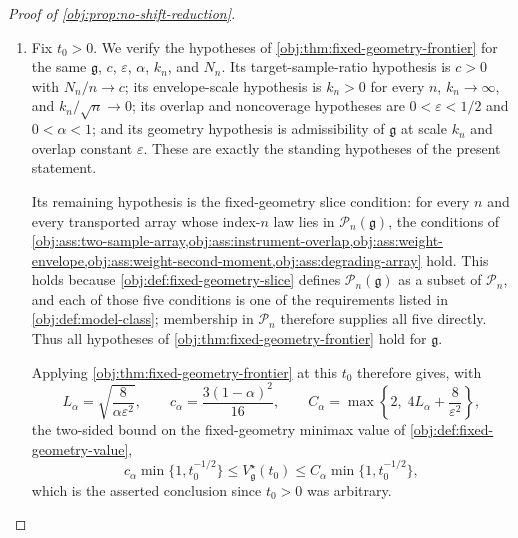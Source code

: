 \begin{proof}[Proof of \cref{obj:prop:no-shift-reduction}]
\begin{enumerate}
By the first step \(\kappa_n=1\), so \(\kappa_n^P=1\), and substituting this into the display for \(t_n\) yields
\[
t_n
=
\frac{n\mu_n^2}{\kappa_n^P}
=
\frac{n\mu_n^2}{\kappa_n}
=
\frac{n\mu_n^2}{1}
=
n\mu_n^2 .
\]

\item Fix \(t_0>0\).  We verify the hypotheses of \cref{obj:thm:fixed-geometry-frontier} for the same \(\mathfrak g\), \(c\), \(\varepsilon\), \(\alpha\), \(k_n\), and \(N_n\).  Its target-sample-ratio hypothesis is \(c>0\) with \(N_n/n\to c\); its envelope-scale hypothesis is \(k_n>0\) for every \(n\), \(k_n\to\infty\), and \(k_n/\sqrt n\to0\); its overlap and noncoverage hypotheses are \(0<\varepsilon<1/2\) and \(0<\alpha<1\); and its geometry hypothesis is admissibility of \(\mathfrak g\) at scale \(k_n\) and overlap constant \(\varepsilon\).  These are exactly the standing hypotheses of the present statement.

Its remaining hypothesis is the fixed-geometry slice condition: for every \(n\) and every transported array whose index-\(n\) law lies in \(\mathcal P_n(\mathfrak g)\), the conditions of \cref{obj:ass:two-sample-array,obj:ass:instrument-overlap,obj:ass:weight-envelope,obj:ass:weight-second-moment,obj:ass:degrading-array} hold.  This holds because \cref{obj:def:fixed-geometry-slice} defines \(\mathcal P_n(\mathfrak g)\) as a subset of \(\mathcal P_n\), and each of those five conditions is one of the requirements listed in \cref{obj:def:model-class}; membership in \(\mathcal P_n\) therefore supplies all five directly.  Thus all hypotheses of \cref{obj:thm:fixed-geometry-frontier} hold for \(\mathfrak g\).

Applying \cref{obj:thm:fixed-geometry-frontier} at this \(t_0\) therefore gives, with
\[
L_\alpha=\sqrt{\frac{8}{\alpha\varepsilon^2}},
\qquad
c_\alpha=\frac{3(1-\alpha)^2}{16},
\qquad
C_\alpha=\max\left\{2,\;4L_\alpha+\frac{8}{\varepsilon^2}\right\},
\]
the two-sided bound on the fixed-geometry minimax value of \cref{obj:def:fixed-geometry-value},
\[
c_\alpha \min\{1,t_0^{-1/2}\}
\le
V_{\mathfrak g}^\star(t_0)
\le
C_\alpha \min\{1,t_0^{-1/2}\},
\]
which is the asserted conclusion since \(t_0>0\) was arbitrary.

\end{enumerate}
\end{proof}

